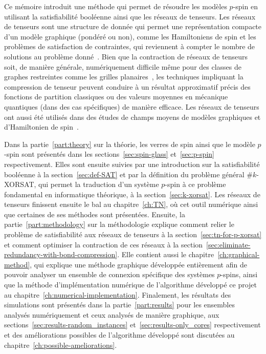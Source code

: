 Ce mémoire introduit une méthode qui permet de résoudre les modèles $p$-spin en utilisant la satisfiabilité booléenne ainsi que les réseaux de tenseurs.
Les réseaux de tenseurs sont une structure de donnée qui permet une représentation compacte d'un modèle graphique (pondéré ou non), comme les Hamiltoniens de spin et les problèmes de satisfaction de contraintes, qui reviennent à compter le nombre de solutions au problème donné~\cite{garcia-saez_exact_2011, biamonte2015tensor, kourtis_fast_2019, Meichanetzidis_2019, de_beaudrap_tensor_2021}.
Bien que la contraction de réseaux de tenseurs soit, de manière générale, numériquement difficile même pour des classes de graphes restreintes comme les grilles planaires~\cite{schuch2007computational}, les techniques impliquant la compression de tenseur peuvent conduire à un résultat approximatif précis des fonctions de partition classiques ou des valeurs moyennes en mécanique quantiques (dans des cas spécifiques) de manière efficace.
Les réseaux de tenseurs ont aussi été utilisés dans des études de champs moyens de modèles graphiques et d'Hamiltonien de spin~\cite{alkabetz2021tensor, pancotti2023one}.

Dans la partie~\ref{part:theory} sur la théorie, les verres de spin ainsi que le modèle $p$-spin sont présentés dans les sections~\ref{sec:spin-glass} et~\ref{sec:p-spin} respectivement.
Elles sont ensuite suivies par une introduction sur la satisfiabilité booléenne à la section~\ref{sec:def-SAT} et par la définition du problème général \#$k$-XORSAT, qui permet la traduction d'un système $p$-spin à ce problème fondamental en informatique théorique, à la section~\ref{sec:k-xorsat}.
Les réseaux de tenseurs finissent ensuite le bal au chapitre~\ref{ch:TN}, où cet outil numérique ainsi que certaines de ses méthodes sont présentées.
Ensuite, la partie~\ref{part:methodology} sur la méthodologie explique comment relier le problème de satisfiabilité aux réseaux de tenseurs à la section~\ref{sec:tn-for-p-xorsat} et comment optimiser la contraction de ces réseaux à la section~\ref{sec:eliminate-redundancy-with-bond-compression}.
Elle contient aussi le chapitre~\ref{ch:graphical-method}, qui explique une méthode graphique développée entièrement afin de pouvoir analyser un ensemble de connexion spécifique des systèmes $p$-spins, ainsi que la méthode d'implémentation numérique de l'algorithme développé ce projet au chapitre~\ref{ch:numerical-implementation}.
Finalement, les résultats des simulations sont présentés dans la partie~\ref{part:results} pour les ensembles analysés numériquement et ceux analysés de manière graphique, aux sections~\ref{sec:results-random_instances} et~\ref{sec:results-only_cores} respectivement et des améliorations possibles de l'algorithme développé sont discutées au chapitre~\ref{ch:possible-ameliorations}.

